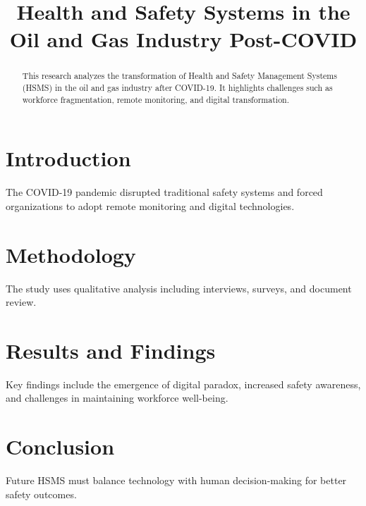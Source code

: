\documentclass[conference]{IEEEtran}
\title{Health and Safety Systems in the Oil and Gas Industry Post-COVID}
\author{\IEEEauthorblockN{Osheen, Manu Garg}}
\begin{document}
\maketitle

\begin{abstract}
This research analyzes the transformation of Health and Safety Management Systems (HSMS) in the oil and gas industry after COVID-19. It highlights challenges such as workforce fragmentation, remote monitoring, and digital transformation.
\end{abstract}

\section{Introduction}
The COVID-19 pandemic disrupted traditional safety systems and forced organizations to adopt remote monitoring and digital technologies.

\section{Methodology}
The study uses qualitative analysis including interviews, surveys, and document review.

\section{Results and Findings}
Key findings include the emergence of digital paradox, increased safety awareness, and challenges in maintaining workforce well-being.

\section{Conclusion}
Future HSMS must balance technology with human decision-making for better safety outcomes.
\end{document}
